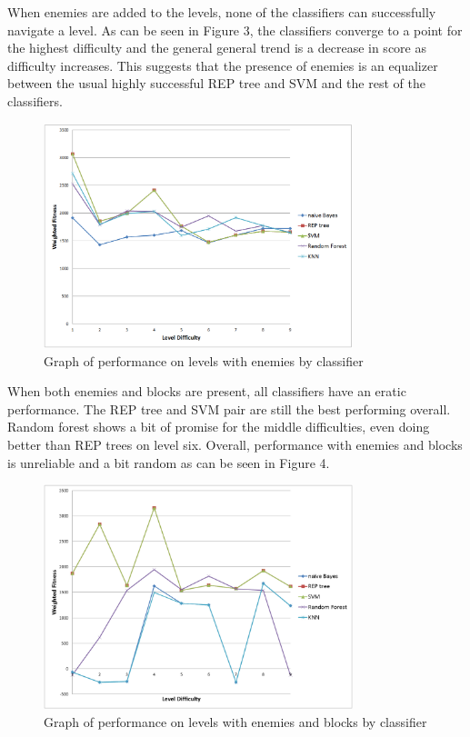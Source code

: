 \documentclass[]{article}   %
\begin{document}
When enemies are added to the levels, none of the classifiers can successfully navigate a level. As can be seen in Figure 3, the classifiers converge
to a point for the highest difficulty and the general general trend is a decrease in score as difficulty increases. This suggests that the presence of enemies
is an equalizer between the usual highly successful REP tree and SVM and the rest of the classifiers.
\begin{figure}[H]
\centering
\includegraphics[width=90mm]{enemies.png}
\caption{Graph of performance on levels with enemies by classifier}
\end{figure}

When both enemies and blocks are present, all classifiers have an eratic performance. The REP tree and SVM pair are still the best performing overall. Random
forest shows a bit of promise for the middle difficulties, even doing better than REP trees on level six. Overall, performance with enemies and blocks is unreliable
and a bit random as can be seen in Figure 4.
\begin{figure}[H]
\centering
\includegraphics[width=90mm]{enemiesblocks.png}
\caption{Graph of performance on levels with enemies and blocks by classifier}
\end{figure}
\end{document}

